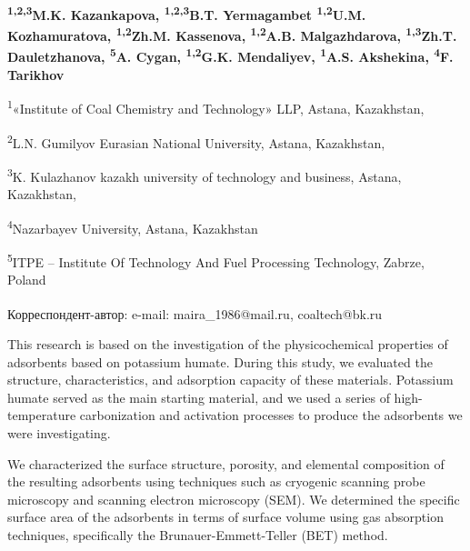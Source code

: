 
\begin{articleheader}

{\bfseries
\textsuperscript{1,2,3}M.K. Kazankapova\textsuperscript{\envelope },
\textsuperscript{1,2,3}B.T. Yermagambet
\textsuperscript{1,2}U.M. Kozhamuratova,
\textsuperscript{1,2}Zh.M. Kassenova,
\textsuperscript{1,2}A.B. Malgazhdarova,
\textsuperscript{1,3}Zh.T. Dauletzhanova,
\textsuperscript{5}A. Cygan,
\textsuperscript{1,2}G.K. Mendaliyev,
\textsuperscript{1}A.S. Akshekina,
\textsuperscript{4}F. Tarikhov
}
\end{articleheader}

\begin{affiliation}
\textsuperscript{1}«Institute of Coal Chemistry and Technology» LLP, Astana, Kazakhstan,

\textsuperscript{2}L.N. Gumilyov Eurasian National University, Astana, Kazakhstan,

\textsuperscript{3}K. Kulazhanov kazakh university of technology and business, Astana, Kazakhstan,

\textsuperscript{4}Nazarbayev University, Astana, Kazakhstan

\textsuperscript{5}ITPE -- Institute Of Technology And Fuel Processing Technology, Zabrze, Poland

\raggedright \textsuperscript{\envelope }Корреспондент-автор: e-mail: maira\_1986@mail.ru, coaltech@bk.ru
\end{affiliation}

This research is based on the investigation of the physicochemical
properties of adsorbents based on potassium humate. During this study,
we evaluated the structure, characteristics, and adsorption capacity of
these materials. Potassium humate served as the main starting material,
and we used a series of high-temperature carbonization and activation
processes to produce the adsorbents we were investigating.

We characterized the surface structure, porosity, and elemental
composition of the resulting adsorbents using techniques such as
cryogenic scanning probe microscopy and scanning electron microscopy
(SEM). We determined the specific surface area of the adsorbents in
terms of surface volume using gas absorption techniques, specifically
the Brunauer-Emmett-Teller (BET) method.

